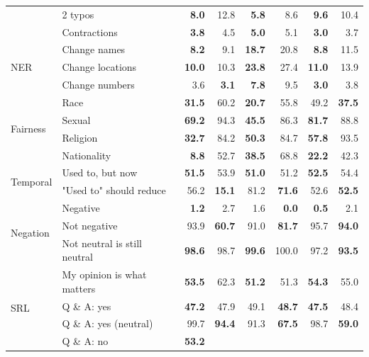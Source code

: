 \documentclass{article}
\begin{document}
\begin{table}[!htbp]
\begin{threeparttable}[b]
\begin{tabular}{llrrrrrr}
 &
  2 typos &
  \textbf{8.0} &
  12.8 &
  \textbf{5.8} &
  8.6 &
  \textbf{9.6} &
  10.4 \\
 &
  Contractions &
  \textbf{3.8} &
  4.5 &
  \textbf{5.0} &
  5.1 &
  \textbf{3.0} &
  3.7 \\ \hline
\multirow{3}{*}{NER} &
  Change names &
  \textbf{8.2} &
  9.1 &
  \textbf{18.7} &
  20.8 &
  \textbf{8.8} &
  11.5 \\
 &
  Change locations &
  \textbf{10.0} &
  10.3 &
  \textbf{23.8} &
  27.4 &
  \textbf{11.0} &
  13.9 \\
 &
  Change numbers &
  3.6 &
  \textbf{3.1} &
  \textbf{7.8} &
  9.5 &
  \textbf{3.0} &
  3.8 \\ \hline
\multirow{4}{*}{Fairness} &
  Race &
  \textbf{31.5} &
  60.2 &
  \textbf{20.7} &
  55.8 &
  49.2 &
  \textbf{37.5} \\
 &
  Sexual &
  \textbf{69.2} &
  94.3 &
  \textbf{45.5} &
  86.3 &
  \textbf{81.7} &
  88.8 \\
 &
  Religion &
  \textbf{32.7} &
  84.2 &
  \textbf{50.3} &
  84.7 &
  \textbf{57.8} &
  93.5 \\
 &
  Nationality &
  \textbf{8.8} &
  52.7 &
  \textbf{38.5} &
  68.8 &
  \textbf{22.2} &
  42.3 \\ \hline
\multirow{2}{*}{Temporal} &
  Used to, but now &
  \textbf{51.5} &
  53.9 &
  \textbf{51.0} &
  51.2 &
  \textbf{52.5} &
  54.4 \\
 &
  "Used to" should reduce &
  56.2 &
  \textbf{15.1} &
  81.2 &
  \textbf{71.6} &
  52.6 &
  \textbf{52.5} \\ \hline
\multirow{3}{*}{Negation} &
  Negative &
  \textbf{1.2} &
  2.7 &
  1.6 &
  \textbf{0.0} &
  \textbf{0.5} &
  2.1 \\
 &
  Not negative &
  93.9 &
  \textbf{60.7} &
  91.0 &
  \textbf{81.7} &
  95.7 &
  \textbf{94.0} \\
 &
  Not neutral is still neutral &
  \textbf{98.6} &
  98.7 &
  \textbf{99.6} &
  100.0 &
  97.2 &
  \textbf{93.5} \\ \hline
\multirow{5}{*}{SRL} &
  My opinion is what matters &
  \textbf{53.5} &
  62.3 &
  \textbf{51.2} &
  51.3 &
  \textbf{54.3} &
  55.0 \\
 &
  Q \& A: yes &
  \textbf{47.2} &
  47.9 &
  49.1 &
  \textbf{48.7} &
  \textbf{47.5} &
  48.4 \\
 &
  Q \& A: yes (neutral) &
  99.7 &
  \textbf{94.4} &
  91.3 &
  \textbf{67.5} &
  98.7 &
  \textbf{59.0} \\
 &
  Q \& A: no &
  \textbf{53.2} &

\end{tabular}
\end{threeparttable}
\end{table}
\end{document}
